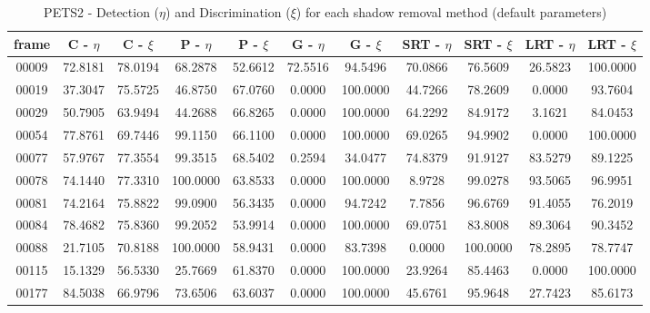 \begin{appendices}
\begin{table}
\centering
\caption{PETS2 - Detection ($\eta$) and Discrimination ($\xi$) for each shadow removal method (default parameters)}
\begin{tabular}{ |c|c|c|c|c|c|c|c|c|c|c| }
	\hline
\textbf{frame} &  \textbf{C - $\eta$} &  \textbf{C - $\xi$} &  \textbf{P - $\eta$} &  \textbf{P - $\xi$} &  \textbf{G - $\eta$} &  \textbf{G - $\xi$} &  \textbf{SRT - $\eta$} &  \textbf{SRT - $\xi$} &  \textbf{LRT - $\eta$} &  \textbf{LRT - $\xi$} \\
\hline
\hline
00009 &  72.8181 &  78.0194 &   68.2878 &  52.6612 &   72.5516 &  94.5496 &   70.0866 &  76.5609 &   26.5823 &  100.0000 \\
\hline
00019 &  37.3047 &  75.5725 &   46.8750 &  67.0760 &   0.0000 &  100.0000 &   44.7266 &  78.2609 &   0.0000 &  93.7604 \\
\hline
00029 &  50.7905 &  63.9494 &   44.2688 &  66.8265 &   0.0000 &  100.0000 &   64.2292 &  84.9172 &   3.1621 &  84.0453 \\
\hline
00054 &  77.8761 &  69.7446 &   99.1150 &  66.1100 &   0.0000 &  100.0000 &   69.0265 &  94.9902 &   0.0000 &  100.0000 \\
\hline
00077 &  57.9767 &  77.3554 &   99.3515 &  68.5402 &   0.2594 &  34.0477 &   74.8379 &  91.9127 &   83.5279 &  89.1225 \\
\hline
00078 &  74.1440 &  77.3310 &   100.0000 &  63.8533 &   0.0000 &  100.0000 &   8.9728 &  99.0278 &   93.5065 &  96.9951 \\
\hline
00081 &  74.2164 &  75.8822 &   99.0900 &  56.3435 &   0.0000 &  94.7242 &   7.7856 &  96.6769 &   91.4055 &  76.2019 \\
\hline
00084 &  78.4682 &  75.8360 &   99.2052 &  53.9914 &   0.0000 &  100.0000 &   69.0751 &  83.8008 &   89.3064 &  90.3452 \\
\hline
00088 &  21.7105 &  70.8188 &   100.0000 &  58.9431 &   0.0000 &  83.7398 &   0.0000 &  100.0000 &   78.2895 &  78.7747 \\
\hline
00115 &  15.1329 &  56.5330 &   25.7669 &  61.8370 &   0.0000 &  100.0000 &   23.9264 &  85.4463 &   0.0000 &  100.0000 \\
\hline
00177 &  84.5038 &  66.9796 &   73.6506 &  63.6037 &   0.0000 &  100.0000 &   45.6761 &  95.9648 &   27.7423 &  85.6173 \\
\hline
\end{tabular}


\end{table}
\end{appendices}
